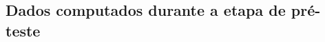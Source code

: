 \begin{apendicesenv}
\hspace{-1.6cm}


\chapter{Dados computados durante a etapa de pré-teste}\label{chap:resul1}


\end{apendicesenv}
